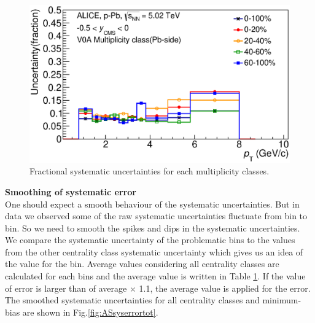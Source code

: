 \begin{figure}[htbp]
\begin{center}
\includegraphics[width=12.0cm]{./Version1/FigChapter5/Systematic/BeforeSmooth.eps}
\caption{Fractional systematic uncertainties for each multiplicity classes.} 
\label{fig:BSsyserrortot}
\end{center}
\end{figure}



\textbf{Smoothing of systematic error}\\
One should expect a smooth behaviour of the systematic uncertainties. But in data we observed some of the raw systematic uncertainties fluctuate from bin to bin. So we need to smooth the spikes and dips in the systematic uncertainties. We compare the systematic uncertainty of the problematic \pt bins to the values from the other centrality class systematic uncertainty which gives us an idea of the value for the bin. Average values considering all centrality classes are calculated for each \pt bins and the average value is written in Table \ref{fig:BSsyserrortot}. If the value of error is larger than  of average $\times$ 1.1, the average value is applied for the error. The smoothed systematic uncertainties for all centrality classes and minimum-bias are shown in Fig.\ref{fig:ASsyserrortot}. %

